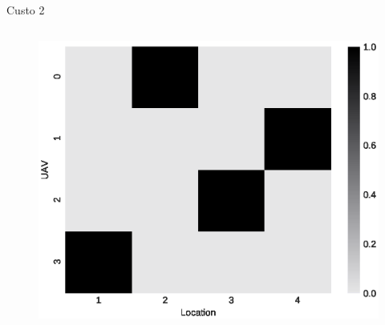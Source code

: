 \begin{frame}{Custo 2}
\begin{columns}
\begin{column}{0.45\textwidth}
\begin{figure}[!htb]
                \end{figure}
                \vspace{-0.5cm}
               \begin{figure}[!htb]
                    \includegraphics[width=\textwidth]{custo_2/0_f_mij_.eps}
                \end{figure}
            \end{column}
        \end{columns}
    \end{frame}